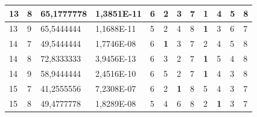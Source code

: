 \documentclass[conference]{IEEEtran}
\begin{document}
\begin{table}[]
\begin{tabular}{|llll|llllllll|}
		\multicolumn{1}{|l|}{13}  & \multicolumn{1}{l|}{8}         & \multicolumn{1}{l|}{65,1777778}    & 1,3851E-11 & \multicolumn{1}{l|}{6}   & \multicolumn{1}{l|}{2}          & \multicolumn{1}{l|}{3}          & \multicolumn{1}{l|}{7}   & \multicolumn{1}{l|}{\textbf{1}} & \multicolumn{1}{l|}{4}          & \multicolumn{1}{l|}{5}          & 8                      \\ \hline
		\multicolumn{1}{|l|}{13}  & \multicolumn{1}{l|}{9}         & \multicolumn{1}{l|}{65,5444444}    & 1,1688E-11 & \multicolumn{1}{l|}{5}   & \multicolumn{1}{l|}{2}          & \multicolumn{1}{l|}{4}          & \multicolumn{1}{l|}{8}   & \multicolumn{1}{l|}{\textbf{1}} & \multicolumn{1}{l|}{3}          & \multicolumn{1}{l|}{6}          & 7                      \\ \hline
		\multicolumn{1}{|l|}{14}  & \multicolumn{1}{l|}{7}         & \multicolumn{1}{l|}{49,5444444}    & 1,7746E-08 & \multicolumn{1}{l|}{6}   & \multicolumn{1}{l|}{\textbf{1}} & \multicolumn{1}{l|}{3}          & \multicolumn{1}{l|}{7}   & \multicolumn{1}{l|}{2}          & \multicolumn{1}{l|}{4}          & \multicolumn{1}{l|}{5}          & 8                      \\ \hline
		\multicolumn{1}{|l|}{14}  & \multicolumn{1}{l|}{8}         & \multicolumn{1}{l|}{72,8333333}    & 3,9456E-13 & \multicolumn{1}{l|}{6}   & \multicolumn{1}{l|}{3}          & \multicolumn{1}{l|}{2}          & \multicolumn{1}{l|}{7}   & \multicolumn{1}{l|}{\textbf{1}} & \multicolumn{1}{l|}{5}          & \multicolumn{1}{l|}{4}          & 8                      \\ \hline
		\multicolumn{1}{|l|}{14}  & \multicolumn{1}{l|}{9}         & \multicolumn{1}{l|}{58,9444444}    & 2,4516E-10 & \multicolumn{1}{l|}{6}   & \multicolumn{1}{l|}{5}          & \multicolumn{1}{l|}{2}          & \multicolumn{1}{l|}{7}   & \multicolumn{1}{l|}{\textbf{1}} & \multicolumn{1}{l|}{4}          & \multicolumn{1}{l|}{3}          & 8                      \\ \hline
		\multicolumn{1}{|l|}{15}  & \multicolumn{1}{l|}{7}         & \multicolumn{1}{l|}{41,2555556}    & 7,2308E-07 & \multicolumn{1}{l|}{6}   & \multicolumn{1}{l|}{2}          & \multicolumn{1}{l|}{\textbf{1}} & \multicolumn{1}{l|}{8}   & \multicolumn{1}{l|}{5}          & \multicolumn{1}{l|}{4}          & \multicolumn{1}{l|}{3}          & 7                      \\ \hline
		\multicolumn{1}{|l|}{15}  & \multicolumn{1}{l|}{8}         & \multicolumn{1}{l|}{49,4777778}    & 1,8289E-08 & \multicolumn{1}{l|}{5}   & \multicolumn{1}{l|}{4}          & \multicolumn{1}{l|}{6}          & \multicolumn{1}{l|}{8}   & \multicolumn{1}{l|}{2}          & \multicolumn{1}{l|}{\textbf{1}} & \multicolumn{1}{l|}{3}          & 7                      \\ \hline

\end{tabular}
\end{table}
\end{document}
